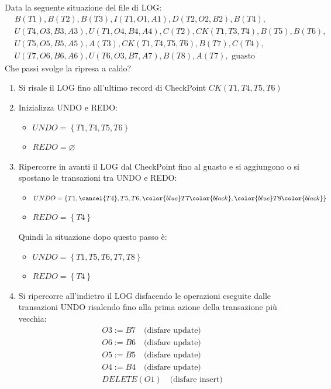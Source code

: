 \documentclass[a4paper,twoside]{article}
\begin{document}
\begin{exercise}
  Data la seguente situazione del file di LOG:
  \[
    \begin{aligned}
      &B(T1), B(T2), B(T3), I(T1,O1,A1), D(T2,O2,B2), B(T4), \\ 
      &U(T4,O3,B3,A3), U(T1,O4,B4,A4), C(T2), CK(T1,T3,T4), B(T5), B(T6), \\ 
      &U(T5,O5,B5,A5), A(T3), CK(T1,T4,T5,T6), B(T7), C(T4), \\
      &U(T7,O6,B6,A6), U(T6,O3,B7,A7), B(T8), A(T7), \text{ guasto}
    \end{aligned}
  \]
  Che passi svolge la ripresa a caldo?

  \begin{enumerate}
    \item Si risale il LOG fino all'ultimo record di CheckPoint \( CK(T1,T4,T5,T6) \)
    \item Inizializza UNDO e REDO:
      \begin{itemize}
        \item \( UNDO = \left\{ T1, T4, T5, T6 \right\} \)
        \item \( REDO = \varnothing \)
      \end{itemize}

    \item Ripercorre in avanti il LOG dal CheckPoint fino al guasto e si aggiungono
      o si spostano le transazioni tra UNDO e REDO:
      \begin{itemize}
        \item \( UNDO = \left\{ T1, \cancel{T4}, T5, T6, \color{blue}T7\color{black}, \color{blue}T8\color{black} \right\} \) 
        \item \( REDO = \left\{ T4 \right\} \) 
      \end{itemize}
      Quindi la situazione dopo questo passo è:
      \begin{itemize}
        \item \( UNDO = \left\{ T1, T5, T6, T7, T8 \right\} \) 
        \item \( REDO = \left\{ T4 \right\} \) 
      \end{itemize}

    \item Si ripercorre all'indietro il LOG disfacendo le operazioni eseguite dalle
      transazioni UNDO risalendo fino alla prima azione della transazione più vecchia:
      \[
        \begin{aligned}
          &O3 := B7 \quad \text{(disfare update)}\\
          &O6 := B6 \quad \text{(disfare update)}\\
          &O5 := B5 \quad \text{(disfare update)}\\
          &O4 := B4 \quad \text{(disfare update)}\\
          &DELETE(O1) \quad \text{(disfare insert)}
        \end{aligned}
      \] 


\end{enumerate}
\end{exercise}
\end{document}

